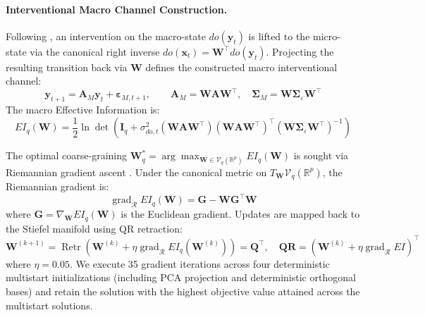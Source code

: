 \documentclass[review,12pt,authoryear]{elsarticle}
\begin{document}
\paragraph{Interventional Macro Channel Construction.}
Following \citet{liu2024exact}, an intervention on the macro-state $do(\mathbf{y}_t)$ is lifted to the micro-state via the canonical right inverse $do(\mathbf{x}_t) = \mathbf{W}^\top do(\mathbf{y}_t)$. Projecting the resulting transition back via $\mathbf{W}$ defines the constructed macro interventional channel:
\begin{equation}
\mathbf{y}_{t+1} = \mathbf{A}_M \mathbf{y}_t + \boldsymbol{\varepsilon}_{M, t+1}, \qquad \mathbf{A}_M = \mathbf{W}\mathbf{A}\mathbf{W}^\top, \quad \boldsymbol{\Sigma}_M = \mathbf{W}\boldsymbol{\Sigma}_\varepsilon \mathbf{W}^\top
\label{eq:macro_dynamics_def}
\end{equation}
The macro Effective Information is:
\begin{equation}
EI_q(\mathbf{W}) = \frac{1}{2} \ln \det\left( \mathbf{I}_q + \sigma_{do,t}^2 (\mathbf{W}\mathbf{A}\mathbf{W}^\top)(\mathbf{W}\mathbf{A}\mathbf{W}^\top)^\top (\mathbf{W}\boldsymbol{\Sigma}_\varepsilon \mathbf{W}^\top)^{-1} \right)
\label{eq:ei_macro_closed}
\end{equation}

The optimal coarse-graining $\mathbf{W}_q^* = \arg\max_{\mathbf{W} \in \mathcal{V}_q(\mathbb{R}^p)} EI_q(\mathbf{W})$ is sought via Riemannian gradient ascent \citep{edelman1998geometry, absil2008optimization}. Under the canonical metric on $T_{\mathbf{W}}\mathcal{V}_q(\mathbb{R}^p)$, the Riemannian gradient is:
\begin{equation}
\operatorname{grad}_{\mathcal{R}} EI_q(\mathbf{W}) = \mathbf{G} - \mathbf{W}\mathbf{G}^\top \mathbf{W}
\end{equation}
where $\mathbf{G} = \nabla_{\mathbf{W}} EI_q(\mathbf{W})$ is the Euclidean gradient. Updates are mapped back to the Stiefel manifold using QR retraction:
\begin{equation}
\mathbf{W}^{(k+1)} = \operatorname{Retr}\left( \mathbf{W}^{(k)} + \eta \operatorname{grad}_{\mathcal{R}} EI_q(\mathbf{W}^{(k)}) \right) = \mathbf{Q}^\top, \quad \mathbf{Q}\mathbf{R} = \left(\mathbf{W}^{(k)} + \eta \operatorname{grad}_{\mathcal{R}} EI\right)^\top
\end{equation}
where $\eta = 0.05$. We execute 35 gradient iterations across four deterministic multistart initializations (including PCA projection and deterministic orthogonal bases) and retain the solution with the highest objective value attained across the multistart solutions.
\end{document}
